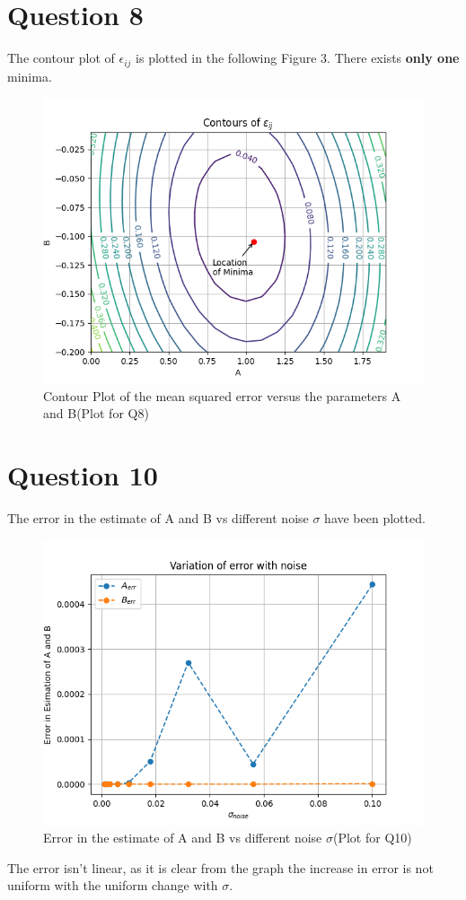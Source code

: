 \documentclass[11pt, a4paper]{article}
\begin{document}
          \section{Question 8}
            The contour plot of $\epsilon_{ij}$ is plotted in the following Figure 3. There exists \textbf{only one} minima.
            \begin{figure}[H]
                \centering
                \includegraphics[scale=0.9]{Figure2.png}
                \caption{Contour Plot of the mean squared error versus the parameters A and B(Plot for Q8)}
            \end{figure}            
             
          \section{Question 10}
            The error in the estimate of A and B vs different noise $\sigma$ have been plotted. 
            \begin{figure}[H]
                \centering
                \includegraphics[scale=0.9]{Figure3.png}
                \caption{Error in the estimate of A and B vs different noise $\sigma$(Plot for Q10)}
            \end{figure}            
             The error isn't linear, as it is clear from the graph the increase in error is not uniform with the uniform change with $\sigma$.
\end{document}
